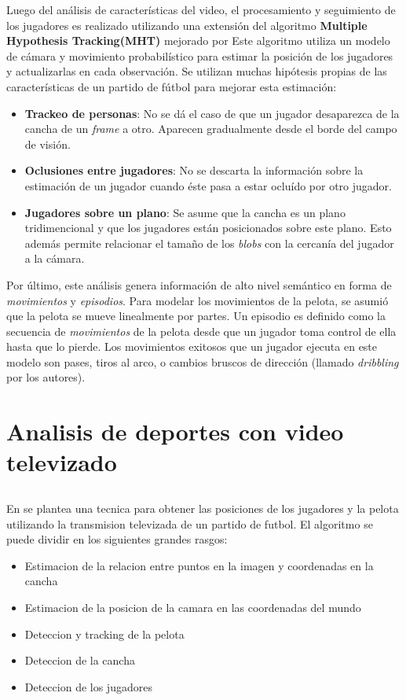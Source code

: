 \documentclass[a4paper,10pt]{article}
\begin{document}
Luego del análisis de características del video, el procesamiento y seguimiento de los jugadores es realizado utilizando
una extensión del algoritmo \textbf{Multiple Hypothesis Tracking(MHT)} \cite{MHT-1, MHT-2} mejorado por \citeauthor*{Schmitt-1, Schmitt-2}
Este algoritmo utiliza un modelo de cámara y movimiento probabilístico para estimar la posición de los jugadores
y actualizarlas en cada observación. Se utilizan muchas hipótesis propias de las características de un partido
de fútbol para mejorar esta estimación: 
\begin{itemize}
  \item \textbf{Trackeo de personas}: No se dá el caso de que un jugador desaparezca de la cancha de un \textit{frame}
  a otro. Aparecen gradualmente desde el borde del campo de visión.
  \item \textbf{Oclusiones entre jugadores}: No se descarta la información sobre la estimación de un jugador cuando 
  éste pasa a estar ocluído por otro jugador.
  \item \textbf{Jugadores sobre un plano}: Se asume que la cancha es un plano tridimencional y que los jugadores
  están posicionados sobre este plano. Esto además permite relacionar el tamaño de los \textit{blobs} con la cercanía
  del jugador a la cámara.
\end{itemize}

Por último, este análisis genera información de alto nivel semántico en forma de \textit{movimientos}
y \textit{episodios}. Para modelar los movimientos de la pelota, se asumió que la pelota se mueve linealmente por partes.
Un episodio es definido como la secuencia de \textit{movimientos} de la pelota desde que un jugador toma control
de ella hasta que lo pierde. Los movimientos exitosos que un jugador ejecuta en este modelo son pases, tiros al arco,
o cambios bruscos de dirección (llamado \textit{dribbling} por los autores).

\section{Analisis de deportes con video televizado}
\label{sec:tv-video}

\subsection{}

En \cite{LIU20061146} se plantea una tecnica para obtener las posiciones de los jugadores y la pelota utilizando la transmision televizada de un partido de futbol.
El algoritmo se puede dividir en los siguientes grandes rasgos:
\begin{itemize}
\item Estimacion de la relacion entre puntos en la imagen y coordenadas en la cancha
\item Estimacion de la posicion de la camara en las coordenadas del mundo
\item Deteccion y tracking de la pelota
\item Deteccion de la cancha
\item Deteccion de los jugadores
\end{itemize}
\end{document}
